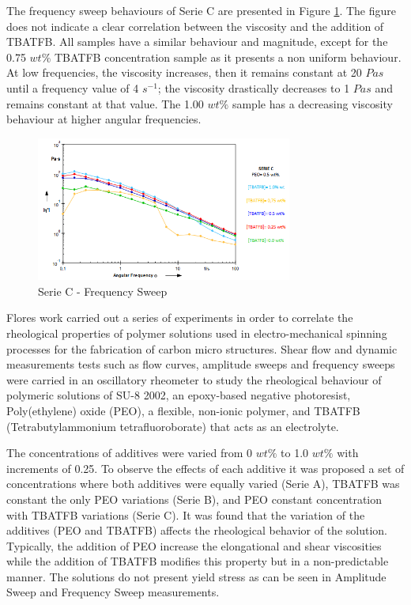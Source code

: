 The frequency sweep behaviours of Serie C are presented in Figure \ref{fig:SerieCfreqSweep}. The figure does not indicate a clear correlation between the viscosity and the addition of TBATFB. All samples have a similar behaviour and magnitude, except for the 0.75 $w t \%$ TBATFB concentration sample as it presents a non uniform behaviour. At low frequencies, the viscosity increases, then it remains constant at 20 $Pa s$ until a frequency value of 4 $s^{-1}$; the viscosity drastically decreases to 1 $Pa s$ and remains constant at that value. The 1.00 $w t \%$ sample has a decreasing viscosity behaviour at higher angular frequencies. 

\begin{figure}[th]
\centering
\includegraphics[width=0.75\textwidth]{./Figures/SerieCfreqSweep.png}
\decoRule
\caption[Serie C - Frequency Sweep]{Serie C - Frequency Sweep}
\label{fig:SerieCfreqSweep}
\end{figure}

Flores work \cite{Flores2017} carried out a series of experiments in order to correlate the rheological properties of polymer solutions used in electro-mechanical spinning processes for the fabrication of carbon micro structures. Shear flow and dynamic measurements tests such as flow curves, amplitude sweeps and frequency sweeps were carried in an oscillatory rheometer to study the rheological behaviour of polymeric solutions of SU-8 2002, an epoxy-based negative photoresist, Poly(ethylene) oxide (PEO), a flexible, non-ionic polymer, and TBATFB (Tetrabutylammonium tetrafluoroborate) that acts as an electrolyte.

The concentrations of additives were varied from 0 $w t \%$ to 1.0 $w t \%$ with increments of 0.25. To observe the effects of each additive it was proposed a set of concentrations where both additives were equally varied (Serie A), TBATFB was constant the only PEO variations (Serie B), and PEO constant concentration with TBATFB variations (Serie C). It was found that the variation of the additives (PEO and TBATFB) affects the
rheological behavior of the solution. Typically, the addition of PEO increase the
elongational and shear viscosities while the addition of TBATFB modifies this property
but in a non-predictable manner. The solutions do not present yield stress as can be
seen in Amplitude Sweep and Frequency Sweep measurements.


